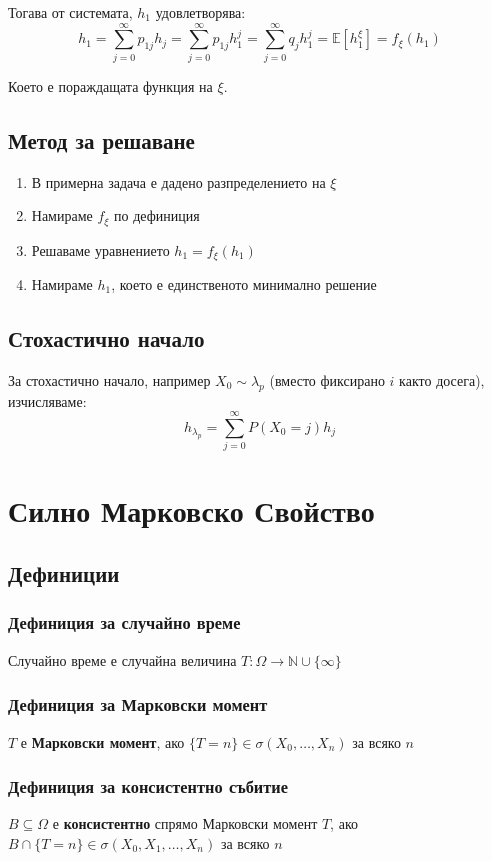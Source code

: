 \documentclass{article}
\begin{document}
Тогава от системата, $h_1$ удовлетворява:
$$ h_1 = \sum_{j=0}^\infty p_{1j} h_j = \sum_{j=0}^\infty p_{1j} h_1^j = \sum_{j=0}^\infty q_j h_1^j = \mathbb{E}[h_1^\xi]= f_\xi(h_1)$$

Което е пораждащата функция на $\xi$.

\subsection{Метод за решаване}
\begin{enumerate}
\item В примерна задача е дадено разпределението на $\xi$
\item Намираме $f_\xi$ по дефиниция
\item Решаваме уравнението $h_1 = f_\xi(h_1)$
\item Намираме $h_1$, което е единственото минимално решение
\end{enumerate}

\subsection{Стохастично начало}
За стохастично начало, например $X_0 \sim \lambda_p$ (вместо фиксирано $i$ както досега), изчисляваме:
$$ h_{\lambda_p} = \sum_{j=0}^\infty P(X_0 = j) h_j $$

\section{Силно Марковско Свойство}
\subsection{Дефиниции}
\subsubsection*{Дефиниция за случайно време}
Случайно време е случайна величина $T: \Omega \to \mathbb{N} \cup \{\infty\}$

\subsubsection*{Дефиниция за Марковски момент}
$T$ е \textbf{Марковски момент}, ако $\{T=n\} \in \sigma(X_0,\dots,X_n)$ за всяко $n$

\subsubsection*{Дефиниция за консистентно събитие}
$B \subseteq \Omega$ е \textbf{консистентно} спрямо Марковски момент $T$, ако \\
$B \cap \{T=n\} \in \sigma(X_0,X_1,\dots,X_n)$ за всяко $n$
\end{document}
